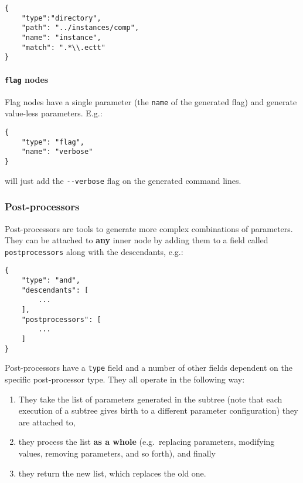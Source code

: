 \documentclass[11pt,notitlepage,twoside,a4paper]{article}
\begin{document}
\begin{lstlisting}
{
    "type":"directory",
    "path": "../instances/comp",
    "name": "instance",
    "match": ".*\\.ectt"
}
\end{lstlisting}

\paragraph{\texttt{flag} nodes}

Flag nodes have a single parameter (the \texttt{name} of the generated
flag) and generate value-less parameters. E.g.:

\begin{lstlisting}
{
    "type": "flag",
    "name": "verbose"
} 
\end{lstlisting}

\noindent
will just add the \texttt{-{}-verbose} flag on the generated command
lines.

\subsubsection{Post-processors}

Post-processors are tools to generate more complex combinations of
parameters. They can be attached to \textbf{any} inner node by adding
them to a field called \texttt{postprocessors} along with the
descendants, e.g.:

\begin{lstlisting}
{
    "type": "and",
    "descendants": [
        ...  
    ],
    "postprocessors": [
        ...
    ]
}
\end{lstlisting}

Post-processors have a \texttt{type} field and a number of other fields
dependent on the specific post-processor type. They all operate in the
following way:

\begin{enumerate}
\item
  They take the list of parameters generated in the subtree (note that
  each execution of a subtree gives birth to a different parameter
  configuration) they are attached to,
\item
  they process the list \textbf{as a whole} (e.g.~replacing parameters,
  modifying values, removing parameters, and so forth), and finally
\item
  they return the new list, which replaces the old one.
\end{enumerate}
\end{document}
